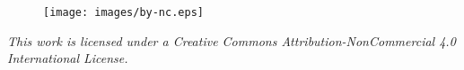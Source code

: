 \thispagestyle{empty}
\mbox{}
\vfill    
\begin{figure}[H]
    \texttt{[image: images/by-nc.eps]}
\end{figure}
\textit{This work is licensed under a Creative Commons Attribution-NonCommercial 4.0 International License.}

